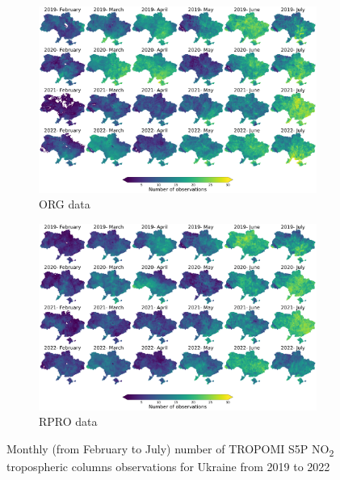 \begin{figure}[p]
    \centering
    \begin{subfigure}{\textwidth}
      \centering
      \includegraphics[width=\textwidth]{figs/chap3/fig2_a.png}
      \caption{ORG data}
    \label{fig:chap3_fig2a}
    \end{subfigure}

    \begin{subfigure}{\textwidth}
      \centering
      \includegraphics[width=\textwidth]{figs/chap3/fig2_b.png}
      \caption{RPRO data}
      \label{fig:chap3_fig2b}
    \end{subfigure}
    \caption[Monthly number of qualitfied S5P NO\textsubscript{2} observations in Ukraine]{Monthly (from February to July) number of TROPOMI S5P NO\textsubscript{2} tropospheric columns observations for Ukraine from 2019 to 2022}
    \label{fig:chap3_fig2}
\end{figure}

